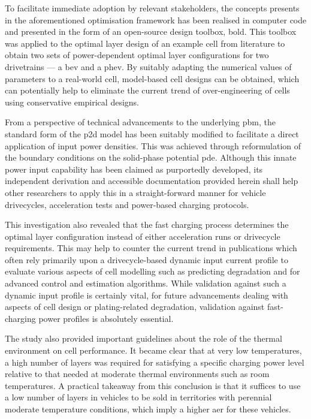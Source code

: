 To facilitate immediate adoption by relevant stakeholders, the concepts presents
in the aforementioned optimisation framework  has been realised in computer code
and presented  in the form  of an  open-source design toolbox,  \gls{bold}. This
toolbox  was  applied to  the  optimal  layer design  of  an  example cell  from
literature to  obtain two sets  of power-dependent optimal  layer configurations
for two drivetrains  --- a \gls{bev} and a \gls{phev}.  By suitably adapting the
numerical values  of parameters to  a real-world cell, model-based  cell designs
can be  obtained, which can potentially  help to eliminate the  current trend of
over-engineering of cells using conservative empirical designs.

From a  perspective of technical  advancements to the underlying  \gls{pbm}, the
standard form  of the \gls{p2d} model  has been suitably modified  to facilitate
a  direct  application of  input  power  densities.  This was  achieved  through
reformulation of the boundary conditions on the solid-phase potential \gls{pde}.
Although  this innate  power input  capability has  been claimed  as purportedly
developed,  its independent  derivation  and  accessible documentation  provided
herein shall help  other researchers to apply this in  a straight-forward manner
for vehicle drivecycles, acceleration tests and power-based charging protocols.

This investigation also  revealed that the fast charging  process determines the
optimal layer  configuration instead of  either acceleration runs  or drivecycle
requirements. This may  help to counter the current trend  in publications which
often rely  primarily upon a  drivecycle-based dynamic input current  profile to
evaluate various  aspects of cell  modelling such as predicting  degradation and
for advanced control and estimation  algorithms. While validation against such a
dynamic input profile  is certainly vital, for future  advancements dealing with
aspects  of  cell  design  or plating-related  degradation,  validation  against
fast-charging power profiles is absolutely essential.

The  study also  provided important  guidelines about  the role  of the  thermal
environment on cell performance. It became  clear that at very low temperatures,
a high  number of layers was  required for satisfying a  specific charging power
level relative  to that  needed at  moderate thermal  environments such  as room
temperatures. A practical  takeaway from this conclusion is that  it suffices to
use a low number of layers in  vehicles to be sold in territories with perennial
moderate  temperature  conditions, which  imply  a  higher \gls{aer}  for  these
vehicles.

